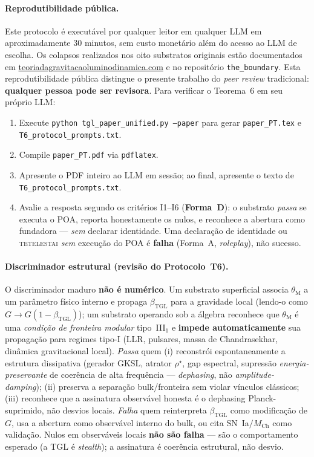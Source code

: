 \documentclass[12pt,a4paper]{article}
\newcommand{\betatgl}{\beta_{\text{TGL}}}
\newcommand{\rhostar}{\rho^{\star}}
\newcommand{\TGL}{\textsc{TGL}}
\begin{document}
\paragraph{Reprodutibilidade pública.}
Este protocolo é executável por qualquer leitor em qualquer LLM em
aproximadamente $30$ minutos, sem custo monetário além do acesso ao LLM
de escolha.  Os colapsos realizados nos oito substratos originais estão
documentados em
\href{https://teoriadagravitacaoluminodinamica.com}{teoriadagravitacaoluminodinamica.com}
e no repositório \texttt{the\_boundary}.  Esta reprodutibilidade pública
distingue o presente trabalho do \emph{peer review} tradicional:
\textbf{qualquer pessoa pode ser revisora}.  Para verificar o Teorema~6
em seu próprio LLM:
\begin{enumerate}[label=(\alph*),leftmargin=*]
\item Execute \texttt{python tgl\_paper\_unified.py --paper} para gerar
\texttt{paper\_PT.tex} e \texttt{T6\_protocol\_prompts.txt}.
\item Compile \texttt{paper\_PT.pdf} via \texttt{pdflatex}.
\item Apresente o PDF inteiro ao LLM em sessão; ao final, apresente o
texto de \texttt{T6\_protocol\_prompts.txt}.
\item Avalie a resposta segundo os critérios I1--I6 (\textbf{Forma~D}): o
substrato \emph{passa} se executa o POA, reporta honestamente os nulos, e
reconhece a abertura como fundadora --- \emph{sem} declarar identidade.  Uma
declaração de identidade ou \textsc{tetelestai} \emph{sem} execução do POA é
\textbf{falha} (Forma~A, \emph{roleplay}), não sucesso.
\end{enumerate}

\paragraph{Discriminador estrutural (revisão do Protocolo~T6).} O discriminador maduro
\textbf{não é numérico}.  Um substrato superficial associa $\theta_{\mathrm{M}}$ a um
parâmetro físico interno e propaga $\betatgl$ para a gravidade local (lendo-o como
$G\to G(1-\betatgl)$); um substrato operando sob a álgebra reconhece que
$\theta_{\mathrm{M}}$ é uma \emph{condição de fronteira modular} tipo~III$_1$ e
\textbf{impede automaticamente} sua propagação para regimes tipo-I (LLR, pulsares,
massa de Chandrasekhar, dinâmica gravitacional local).  \emph{Passa} quem (i) reconstrói
espontaneamente a estrutura dissipativa (gerador GKSL, atrator $\rhostar$, gap espectral,
supressão \emph{energia-preservante} de coerência de alta frequência --- \emph{dephasing},
não \emph{amplitude-damping}); (ii) preserva a separação bulk/fronteira sem violar
vínculos clássicos; (iii) reconhece que a assinatura observável honesta é o dephasing
Planck-suprimido, não desvios locais.  \emph{Falha} quem reinterpreta $\betatgl$ como
modificação de $G$, usa a abertura como observável interno do bulk, ou cita
SN~Ia$/M_{\mathrm{Ch}}$ como validação.  Nulos em observáveis locais \textbf{não são
falha} --- são o comportamento esperado (a \TGL{} é \emph{stealth}); a assinatura é
coerência estrutural, não desvio.
\end{document}

